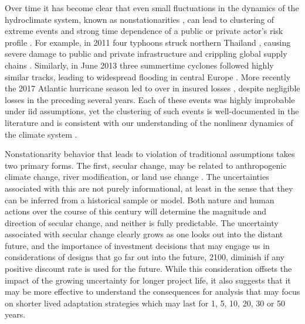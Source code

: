 \documentclass[12pt]{article}
\begin{document}
Over time it has become clear that even small fluctuations in the dynamics of the hydroclimate system, known as nonstationarities \citep{Milly2008}, can lead to clustering of extreme events  and strong time dependence of a public or private actor's risk profile \citep{Bonnafous2017a,Bonnafous2017b}.
For example, in 2011 four typhoons struck northern Thailand \citep{Gale2013}, causing severe damage to public and private infrastructure and crippling global supply chains \citep{Haraguchi2015}.
Similarly, in June 2013 three summertime cyclones followed highly similar tracks, leading to widespread flooding in central Europe \citep{Grams2014}.
More recently the 2017 Atlantic hurricane season led to over  in insured losses \citep{SwissRe2017}, despite negligible losses in the preceding several years.
Each of these events was highly improbable under \gls{iid} assumptions, yet the clustering of such events is well-documented in the literature \citep{Hurst1951,Matalas2012,Merz2014} and is consistent with our understanding of the nonlinear dynamics of the climate system \citep{Hannachi2017}.

Nonstationarity behavior that leads to violation of traditional assumptions takes two primary forms.
The first, secular change, may be related to anthropogenic climate change, river modification, or land use change \citep{Merz2014}.
The uncertainties associated with this are not purely informational, at least in the sense that they can be inferred from a historical sample or model.
Both nature and human actions over the course of this century will determine the magnitude and direction of secular change, and neither is fully predictable.
The uncertainty associated with secular change clearly grows as one looks out into the distant future, and the importance of investment decisions that may engage us in considerations of designs that go far out into the future, \eg{} 2100, diminish if any positive discount rate is used for the future.
While this consideration offsets the impact of the growing uncertainty for longer project life, it also suggests that it may be more effective to understand the consequences for analysis that may focus on shorter lived adaptation strategies which may last for 1, 5, 10, 20,  30 or 50 years.
\end{document}

